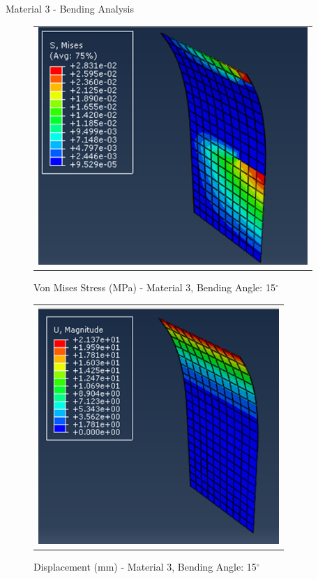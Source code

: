 \documentclass[a4paper,12pt]{article}
\numberwithin{equation}{section}
\numberwithin{figure}{section}
\begin{document}

\newpage
\noindent Material 3 - Bending Analysis 
\begin{figure}[H]
  \centering
  \begin{tabular}{@{}c@{}}
    \includegraphics[width=0.7\linewidth,height=255pt]{Results/Bending/M3_VMS_15.png} \\
  \end{tabular}
  \caption{Von Mises Stress (MPa) - Material 3,  Bending Angle: 15$^{\circ}$ }
\end{figure}

\begin{figure}[H]
  \centering
  \begin{tabular}{@{}c@{}}
    \includegraphics[width=0.7\linewidth,height=255pt]{Results/Bending/M3_DIS_15.png} \\
  \end{tabular}
  \caption{Displacement (mm) - Material 3, Bending Angle: 15$^{\circ}$}
\end{figure}
\end{document}
